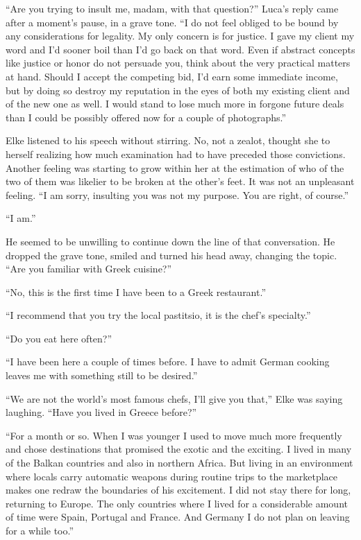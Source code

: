``Are you trying to insult me, madam, with that question?'' Luca's reply came after a moment's pause, in a grave tone. ``I do not feel obliged to be bound by any considerations for legality. My only concern is for justice. I gave my client my word and I'd sooner boil than I'd go back on that word. Even if abstract concepts like justice or honor do not persuade you, think about the very practical matters at hand. Should I accept the competing bid, I'd earn some immediate income, but by doing so destroy my reputation in the eyes of both my existing client and of the new one as well. I would stand to lose much more in forgone future deals than I could be possibly offered now for a couple of photographs.''

Elke listened to his speech without stirring. No, not a zealot, thought she to herself realizing how much examination had to have preceded those convictions. Another feeling was starting to grow within her at the estimation of who of the two of them was likelier to be broken at the other's feet. It was not an unpleasant feeling. ``I am sorry, insulting you was not my purpose. You are right, of course.''

``I am.''

He seemed to be unwilling to continue down the line of that conversation. He dropped the grave tone, smiled and turned his head away, changing the topic. ``Are you familiar with Greek cuisine?''

``No, this is the first time I have been to a Greek restaurant.''

``I recommend that you try the local pastitsio, it is the chef's specialty.''

``Do you eat here often?''

``I have been here a couple of times before. I have to admit German cooking leaves me with something still to be desired.''

``We are not the world's most famous chefs, I'll give you that,'' Elke was saying laughing. ``Have you lived in Greece before?''

``For a month or so. When I was younger I used to move much more frequently and chose destinations that promised the exotic and the exciting. I lived in many of the Balkan countries and also in northern Africa. But living in an environment where locals carry automatic weapons during routine trips to the marketplace makes one redraw the boundaries of his excitement. I did not stay there for long, returning to Europe. The only countries where I lived for a considerable amount of time were Spain, Portugal and France. And Germany I do not plan on leaving for a while too.''

